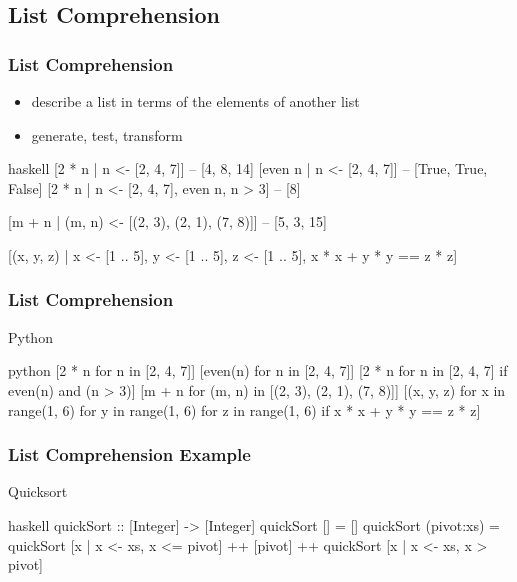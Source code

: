 \documentclass[dvipsnames]{beamer}
\theoremstyle{plain}
\begin{document}
\subsection{List Comprehension}

\begin{frame}[fragile]
  \frametitle{List Comprehension}

  \begin{itemize}
    \item describe a list in terms of the elements of another list
    \item generate, test, transform
  \end{itemize}

  \begin{exampleblock}{}
    \begin{pygments}{haskell}
[2 * n | n <- [2, 4, 7]]  -- [4, 8, 14]
[even n | n <- [2, 4, 7]] -- [True, True, False]
[2 * n | n <- [2, 4, 7], even n, n > 3]  -- [8]

[m + n | (m, n) <- [(2, 3), (2, 1), (7, 8)]]
-- [5, 3, 15]

[(x, y, z) | x <- [1 .. 5],
             y <- [1 .. 5],
             z <- [1 .. 5],
             x * x + y * y == z * z]
    \end{pygments}
  \end{exampleblock}
\end{frame}

\begin{frame}[fragile]
  \frametitle{List Comprehension}

  \begin{exampleblock}{Python}
    \begin{pygments}{python}
[2 * n for n in [2, 4, 7]]
[even(n) for n in [2, 4, 7]]
[2 * n for n in [2, 4, 7] if even(n) and (n > 3)]
[m + n for (m, n) in [(2, 3), (2, 1), (7, 8)]]
[(x, y, z) for x in range(1, 6)
           for y in range(1, 6)
           for z in range(1, 6)
           if x * x + y * y == z * z]
    \end{pygments}
  \end{exampleblock}
\end{frame}

\begin{frame}[fragile]
  \frametitle{List Comprehension Example}

  \begin{exampleblock}{Quicksort}
    \begin{pygments}{haskell}
quickSort :: [Integer] -> [Integer]
quickSort [] = []
quickSort (pivot:xs) =
    quickSort [x | x <- xs, x <= pivot]
    ++ [pivot]
    ++ quickSort [x | x <- xs, x > pivot]
    \end{pygments}
  \end{exampleblock}
\end{frame}
\end{document}
